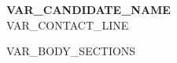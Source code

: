 \documentclass[letterpaper,VAR_FONT_SIZE]{article}
\begin{document}
\begin{center}
    {\Huge \bfseries \color{headingcolor} VAR_CANDIDATE_NAME} \\ \vspace{3pt}
    \small \color{mutedcolor} VAR_CONTACT_LINE
\end{center}

VAR_BODY_SECTIONS
\end{document}
